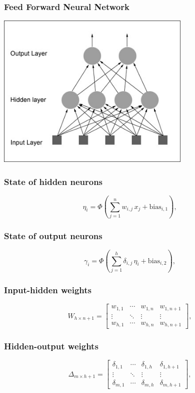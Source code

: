 \begin{frame}
    \frametitle{Feed Forward Neural Network}
\includegraphics[width=0.7\textwidth]{simple_feedforward_network}
\end{frame}


\begin{frame}
\frametitle{State of hidden neurons}
\[
  \eta_{i} =
  \Phi \left(
    \sum_{j=1}^{n}
    w_{i,j}\,x_j + \text{bias}_{i,1}
  \right),
\]
\end{frame}

\begin{frame}
\frametitle{State of output neurons}
\[
  \gamma_{i} =
  \Phi\left(
    \sum_{j=1}^{h}
    \delta_{i,j}\,\eta_i + \text{bias}_{i,2}
  \right),
\]
\end{frame}

\begin{frame}
    \frametitle{Input-hidden weights}
  \[
    W_{h \times {n+1}} =
    \left[
      \begin{array}{ccc|c}
        w_{1, 1} & \cdots & w_{1, n} & w_{1, n+1} \\
        \vdots   & \ddots & \vdots   & \vdots     \\
        w_{h, 1} & \cdots & w_{h, n} & w_{h, n+1}
      \end{array}
    \right],
  \]
\end{frame}

\begin{frame}
    \frametitle{Hidden-output weights}
  \[
    \Delta_{m \times h+1} =
    \left[
      \begin{array}{ccc|c}
        \delta_{1,1} & \cdots & \delta_{1,h} & \delta_{1,h+1}\\
        \vdots & \ddots &  \vdots & \vdots\\
        \delta_{m,1} & \cdots & \delta_{m,h} &\delta_{m,h+1}
      \end{array}
    \right],
  \]
\end{frame}

